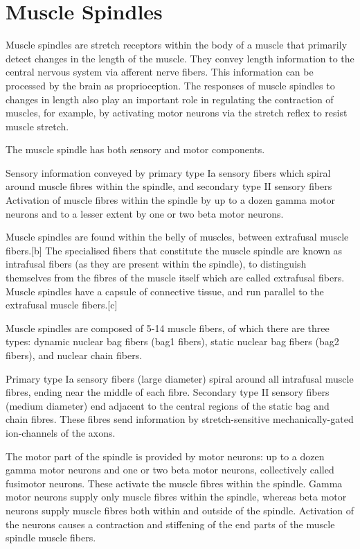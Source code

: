 \hypertarget{muscle-spindles}{%
\section{Muscle Spindles}\label{muscle-spindles}}

Muscle spindles are stretch receptors within the body of a muscle that primarily detect changes in the length of the muscle. They convey length information to the central nervous system via afferent nerve fibers. This information can be processed by the brain as proprioception. The responses of muscle spindles to changes in length also play an important role in regulating the contraction of muscles, for example, by activating motor neurons via the stretch reflex to resist muscle stretch.

The muscle spindle has both sensory and motor components.

Sensory information conveyed by primary type Ia sensory fibers which spiral around muscle fibres within the spindle, and secondary type II sensory fibers
Activation of muscle fibres within the spindle by up to a dozen gamma motor neurons and to a lesser extent by one or two beta motor neurons.

Muscle spindles are found within the belly of muscles, between extrafusal muscle fibers.{[}b{]} The specialised fibers that constitute the muscle spindle are known as intrafusal fibers (as they are present within the spindle), to distinguish themselves from the fibres of the muscle itself which are called extrafusal fibers. Muscle spindles have a capsule of connective tissue, and run parallel to the extrafusal muscle fibers.{[}c{]}

Muscle spindles are composed of 5-14 muscle fibers, of which there are three types: dynamic nuclear bag fibers (bag1 fibers), static nuclear bag fibers (bag2 fibers), and nuclear chain fibers.

Primary type Ia sensory fibers (large diameter) spiral around all intrafusal muscle fibres, ending near the middle of each fibre. Secondary type II sensory fibers (medium diameter) end adjacent to the central regions of the static bag and chain fibres. These fibres send information by stretch-sensitive mechanically-gated ion-channels of the axons.

The motor part of the spindle is provided by motor neurons: up to a dozen gamma motor neurons and one or two beta motor neurons, collectively called fusimotor neurons. These activate the muscle fibres within the spindle. Gamma motor neurons supply only muscle fibres within the spindle, whereas beta motor neurons supply muscle fibres both within and outside of the spindle. Activation of the neurons causes a contraction and stiffening of the end parts of the muscle spindle muscle fibers.


